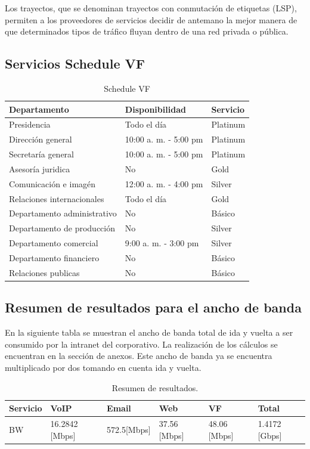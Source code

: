 \documentclass[12pt,letterpaper]{article}
\begin{document}
Los trayectos, que se denominan trayectos con conmutación de etiquetas (LSP), 
permiten a los proveedores de servicios decidir de antemano la mejor manera de 
que determinados tipos de tráfico fluyan dentro de una red privada o pública. \cite{mpls}

\subsection{Servicios Schedule VF}
\begin{table}[ht]
    \centering
    \begin{tabular}{|l|l|l|}
    \hline
    Departamento & Disponibilidad & Servicio \\ \hline
    Presidencia & Todo el día & Platinum \\ \hline
    Dirección general & 10:00 a. m. - 5:00 pm & Platinum \\ \hline
    Secretaría general & 10:00 a. m. - 5:00 pm & Platinum \\ \hline
    Asesoría juridica & No & Gold \\ \hline
    Comunicación e imagén & 12:00 a. m. - 4:00 pm & Silver \\ \hline
    Relaciones internacionales & Todo el día & Gold \\ \hline
    Departamento administrativo & No & Básico \\ \hline
    Departamento de producción & No & Silver \\ \hline
    Departamento comercial & 9:00 a. m. - 3:00 pm & Silver \\ \hline
    Departamento financiero & No & Básico\\ \hline
    Relaciones publicas & No & Básico \\ \hline
    \end{tabular}
    \caption{Schedule VF}
    \label{my-label}
\end{table}

\subsection{Resumen de resultados para el ancho de banda}
En la siguiente tabla se muestran el ancho de banda total de ida y vuelta a ser consumido por 
la intranet del corporativo. La realización de los cálculos se encuentran en la sección de 
anexos. Este ancho de banda ya se encuentra multiplicado por dos tomando en cuenta ida y vuelta.
\begin{table}[ht]
    \centering
    \begin{tabular}{|l|l|l|l|l|l|}
    \hline
    Servicio & VoIP & Email & Web & VF & Total \\ \hline
    BW & 16.2842 [Mbps] & 572.5[Mbps] & 37.56 [Mbps] & 48.06 [Mbps] & 1.4172 [Gbps] \\ \hline
    \end{tabular}
    \caption{Resumen de resultados.}
    \label{my-label}
\end{table}
\end{document}
